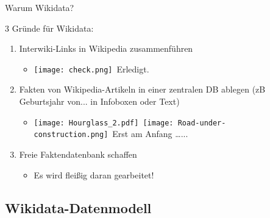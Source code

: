 \documentclass{beamer}
\begin{document}
\begin{frame}{Warum Wikidata?}

3 Gründe für Wikidata:

  \vspace{0.3cm}

  \begin{enumerate}
    \item Interwiki-Links in Wikipedia zusammenführen \pause
      \begin{itemize}
        \item \texttt{[image: check.png]}~Erledigt. \pause
      \end{itemize}

  \vspace{0.3cm}

    \item Fakten von Wikipedia-Artikeln in einer zentralen DB ablegen (zB Geburtsjahr von... in Infoboxen oder Text) \pause
      \begin{itemize}
        \item \texttt{[image: Hourglass\_2.pdf]}~\texttt{[image: Road-under-construction.png]}~Erst am Anfang \dots... \pause
      \end{itemize}

  \vspace{0.3cm}

    \item Freie Faktendatenbank schaffen \pause
      \begin{itemize}
        \item Es wird fleißig daran gearbeitet!
      \end{itemize}
  \end{enumerate}

\end{frame}

\subsection{Wikidata-Datenmodell}
\end{document}
